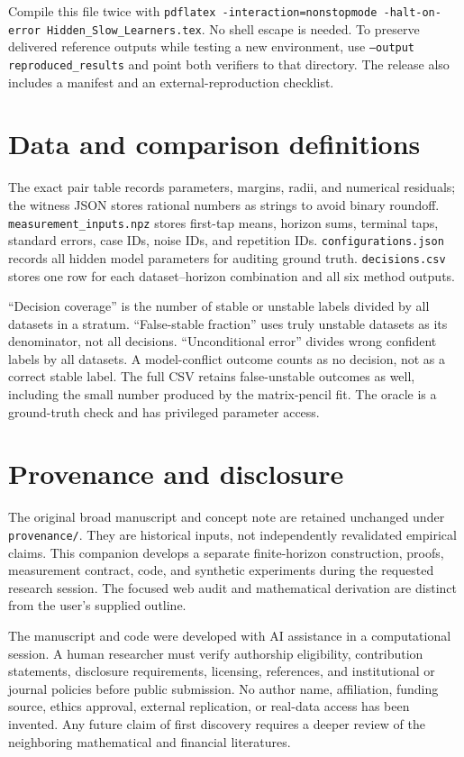 \documentclass[11pt]{article}
\theoremstyle{remark}\newtheorem{remark}[theorem]{Remark}
\begin{document}
Compile this file twice with \texttt{pdflatex -interaction=nonstopmode -halt-on-error Hidden\_Slow\_Learners.tex}. No shell escape is needed. To preserve delivered reference outputs while testing a new environment, use \texttt{--output reproduced\_results} and point both verifiers to that directory. The release also includes a manifest and an external-reproduction checklist.

\section{Data and comparison definitions}
The exact pair table records parameters, margins, radii, and numerical residuals; the witness JSON stores rational numbers as strings to avoid binary roundoff. \texttt{measurement\_inputs.npz} stores first-tap means, horizon sums, terminal taps, standard errors, case IDs, noise IDs, and repetition IDs. \texttt{configurations.json} records all hidden model parameters for auditing ground truth. \texttt{decisions.csv} stores one row for each dataset--horizon combination and all six method outputs.

``Decision coverage'' is the number of stable or unstable labels divided by all datasets in a stratum. ``False-stable fraction'' uses truly unstable datasets as its denominator, not all decisions. ``Unconditional error'' divides wrong confident labels by all datasets. A model-conflict outcome counts as no decision, not as a correct stable label. The full CSV retains false-unstable outcomes as well, including the small number produced by the matrix-pencil fit. The oracle is a ground-truth check and has privileged parameter access.

\section{Provenance and disclosure}
The original broad manuscript and concept note are retained unchanged under \texttt{provenance/}. They are historical inputs, not independently revalidated empirical claims. This companion develops a separate finite-horizon construction, proofs, measurement contract, code, and synthetic experiments during the requested research session. The focused web audit and mathematical derivation are distinct from the user's supplied outline.

The manuscript and code were developed with AI assistance in a computational session. A human researcher must verify authorship eligibility, contribution statements, disclosure requirements, licensing, references, and institutional or journal policies before public submission. No author name, affiliation, funding source, ethics approval, external replication, or real-data access has been invented. Any future claim of first discovery requires a deeper review of the neighboring mathematical and financial literatures.
\end{document}
